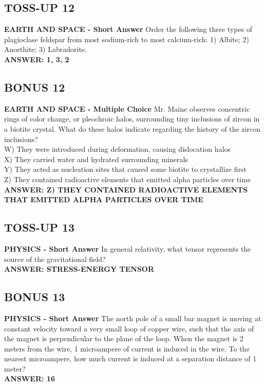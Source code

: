 \documentclass{article}
\begin{document}
\subsection*{TOSS-UP 12}
\textbf{EARTH AND SPACE - Short Answer} Order the following three types of plagioclase feldspar from most sodium-rich to most calcium-rich: 1) Albite; 2) Anorthite; 3) Labradorite. \\
\textbf{ANSWER: 1, 3, 2}

\subsection*{BONUS 12}
\textbf{EARTH AND SPACE - Multiple Choice} Mr. Maine observes concentric rings of color change, or pleochroic halos, surrounding tiny inclusions of zircon in a biotite crystal. What do these halos indicate regarding the history of the zircon inclusions? \\
W) They were introduced during deformation, causing dislocation halos \\
X) They carried water and hydrated surrounding minerals \\
Y) They acted as nucleation sites that caused some biotite to crystallize first \\
Z) They contained radioactive elements that emitted alpha particles over time \\
\textbf{ANSWER: Z) THEY CONTAINED RADIOACTIVE ELEMENTS THAT EMITTED ALPHA PARTICLES OVER TIME}

\subsection*{TOSS-UP 13}
\textbf{PHYSICS - Short Answer} In general relativity, what tensor represents the source of the gravitational field? \\
\textbf{ANSWER: STRESS-ENERGY TENSOR}

\subsection*{BONUS 13}
\textbf{PHYSICS - Short Answer} The north pole of a small bar magnet is moving at constant velocity toward a very small loop of copper wire, such that the axis of the magnet is perpendicular to the plane of the loop. When the magnet is 2 meters from the wire, 1 microampere of current is induced in the wire. To the nearest microampere, how much current is induced at a separation distance of 1 meter? \\
\textbf{ANSWER: 16}
\end{document}
